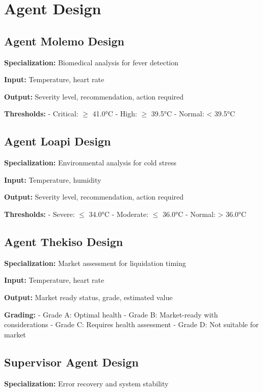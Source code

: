 \section{Agent Design}

\subsection{Agent Molemo Design}

\textbf{Specialization:} Biomedical analysis for fever detection

\textbf{Input:} Temperature, heart rate

\textbf{Output:} Severity level, recommendation, action required

\textbf{Thresholds:}
- Critical: $\geq$ 41.0°C
- High: $\geq$ 39.5°C
- Normal: < 39.5°C

\subsection{Agent Loapi Design}

\textbf{Specialization:} Environmental analysis for cold stress

\textbf{Input:} Temperature, humidity

\textbf{Output:} Severity level, recommendation, action required

\textbf{Thresholds:}
- Severe: $\leq$ 34.0°C
- Moderate: $\leq$ 36.0°C
- Normal: > 36.0°C

\subsection{Agent Thekiso Design}

\textbf{Specialization:} Market assessment for liquidation timing

\textbf{Input:} Temperature, heart rate

\textbf{Output:} Market ready status, grade, estimated value

\textbf{Grading:}
- Grade A: Optimal health
- Grade B: Market-ready with considerations
- Grade C: Requires health assessment
- Grade D: Not suitable for market

\subsection{Supervisor Agent Design}

\textbf{Specialization:} Error recovery and system stability

